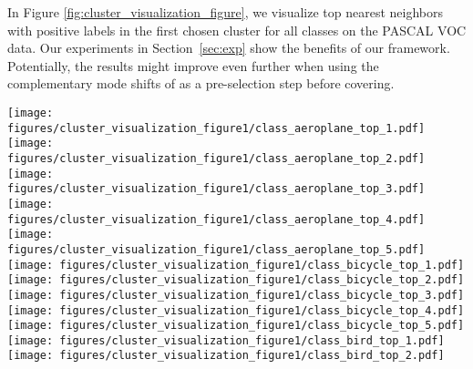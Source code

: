 \documentclass{article}
\begin{document}
In Figure \ref{fig:cluster_visualization_figure}, we visualize top  nearest neighbors with positive labels in the first chosen cluster  for all  classes on the PASCAL VOC data.
Our experiments in Section~\ref{sec:exp} show the benefits of our framework. Potentially, the results might improve even further when using the complementary mode shifts of \citep{discovery3} as a pre-selection step before covering.



\begin{figure*}[htbp]
\centering
\texttt{[image: figures/cluster\_visualization\_figure1/class\_aeroplane\_top\_1.pdf]}\hspace{-0.12cm}
\texttt{[image: figures/cluster\_visualization\_figure1/class\_aeroplane\_top\_2.pdf]}\hspace{-0.12cm}
\texttt{[image: figures/cluster\_visualization\_figure1/class\_aeroplane\_top\_3.pdf]}\hspace{-0.12cm}
\texttt{[image: figures/cluster\_visualization\_figure1/class\_aeroplane\_top\_4.pdf]}\hspace{-0.12cm}
\texttt{[image: figures/cluster\_visualization\_figure1/class\_aeroplane\_top\_5.pdf]}\hspace{0.2cm}
\texttt{[image: figures/cluster\_visualization\_figure1/class\_bicycle\_top\_1.pdf]}\hspace{-0.12cm}
\texttt{[image: figures/cluster\_visualization\_figure1/class\_bicycle\_top\_2.pdf]}\hspace{-0.12cm}
\texttt{[image: figures/cluster\_visualization\_figure1/class\_bicycle\_top\_3.pdf]}\hspace{-0.12cm}
\texttt{[image: figures/cluster\_visualization\_figure1/class\_bicycle\_top\_4.pdf]}\hspace{-0.12cm}
\texttt{[image: figures/cluster\_visualization\_figure1/class\_bicycle\_top\_5.pdf]}\vspace{0.2cm}\\
\texttt{[image: figures/cluster\_visualization\_figure1/class\_bird\_top\_1.pdf]}\hspace{-0.12cm}
\texttt{[image: figures/cluster\_visualization\_figure1/class\_bird\_top\_2.pdf]}\hspace{-0.12cm}

\end{figure*}
\end{document}
